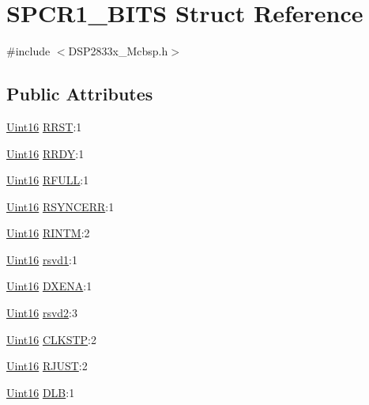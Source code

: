 \hypertarget{struct_s_p_c_r1___b_i_t_s}{}\section{S\+P\+C\+R1\+\_\+\+B\+I\+T\+S Struct Reference}
\label{struct_s_p_c_r1___b_i_t_s}


{\ttfamily \#include $<$D\+S\+P2833x\+\_\+\+Mcbsp.\+h$>$}

\subsection*{Public Attributes}
\begin{DoxyCompactItemize}
\item 
\hyperlink{_d_s_p2833x___device_8h_a59a9f6be4562c327cbfb4f7e8e18f08b}{Uint16} \hyperlink{struct_s_p_c_r1___b_i_t_s_a12da8f4e7bac0c5273909f3eb231e0f7}{R\+R\+S\+T}\+:1
\item 
\hyperlink{_d_s_p2833x___device_8h_a59a9f6be4562c327cbfb4f7e8e18f08b}{Uint16} \hyperlink{struct_s_p_c_r1___b_i_t_s_a9508e2b11c6ec77c6a1ff84ec7257a37}{R\+R\+D\+Y}\+:1
\item 
\hyperlink{_d_s_p2833x___device_8h_a59a9f6be4562c327cbfb4f7e8e18f08b}{Uint16} \hyperlink{struct_s_p_c_r1___b_i_t_s_a9ea542a8b6e10df3f82ecd3e022c2b0c}{R\+F\+U\+L\+L}\+:1
\item 
\hyperlink{_d_s_p2833x___device_8h_a59a9f6be4562c327cbfb4f7e8e18f08b}{Uint16} \hyperlink{struct_s_p_c_r1___b_i_t_s_ae45db758df8d41708aae57f6997a7fdf}{R\+S\+Y\+N\+C\+E\+R\+R}\+:1
\item 
\hyperlink{_d_s_p2833x___device_8h_a59a9f6be4562c327cbfb4f7e8e18f08b}{Uint16} \hyperlink{struct_s_p_c_r1___b_i_t_s_abac8c809c3f8e96433391c9e27e46db1}{R\+I\+N\+T\+M}\+:2
\item 
\hyperlink{_d_s_p2833x___device_8h_a59a9f6be4562c327cbfb4f7e8e18f08b}{Uint16} \hyperlink{struct_s_p_c_r1___b_i_t_s_a8081662e674b5fd6793138b41d8c24ae}{rsvd1}\+:1
\item 
\hyperlink{_d_s_p2833x___device_8h_a59a9f6be4562c327cbfb4f7e8e18f08b}{Uint16} \hyperlink{struct_s_p_c_r1___b_i_t_s_a1ae9e2cc5016dc18ea003add054d48ae}{D\+X\+E\+N\+A}\+:1
\item 
\hyperlink{_d_s_p2833x___device_8h_a59a9f6be4562c327cbfb4f7e8e18f08b}{Uint16} \hyperlink{struct_s_p_c_r1___b_i_t_s_a12bf10c6bc2a81a31ed9c209b3d2dce1}{rsvd2}\+:3
\item 
\hyperlink{_d_s_p2833x___device_8h_a59a9f6be4562c327cbfb4f7e8e18f08b}{Uint16} \hyperlink{struct_s_p_c_r1___b_i_t_s_a43c3072df6cde191299ee7a6ef77b827}{C\+L\+K\+S\+T\+P}\+:2
\item 
\hyperlink{_d_s_p2833x___device_8h_a59a9f6be4562c327cbfb4f7e8e18f08b}{Uint16} \hyperlink{struct_s_p_c_r1___b_i_t_s_a3f45b28385d8e2a0e5ff75cb911be9a9}{R\+J\+U\+S\+T}\+:2
\item 
\hyperlink{_d_s_p2833x___device_8h_a59a9f6be4562c327cbfb4f7e8e18f08b}{Uint16} \hyperlink{struct_s_p_c_r1___b_i_t_s_af049f67365b8b3ad3ad3c3124e5704fe}{D\+L\+B}\+:1
\end{DoxyCompactItemize}


